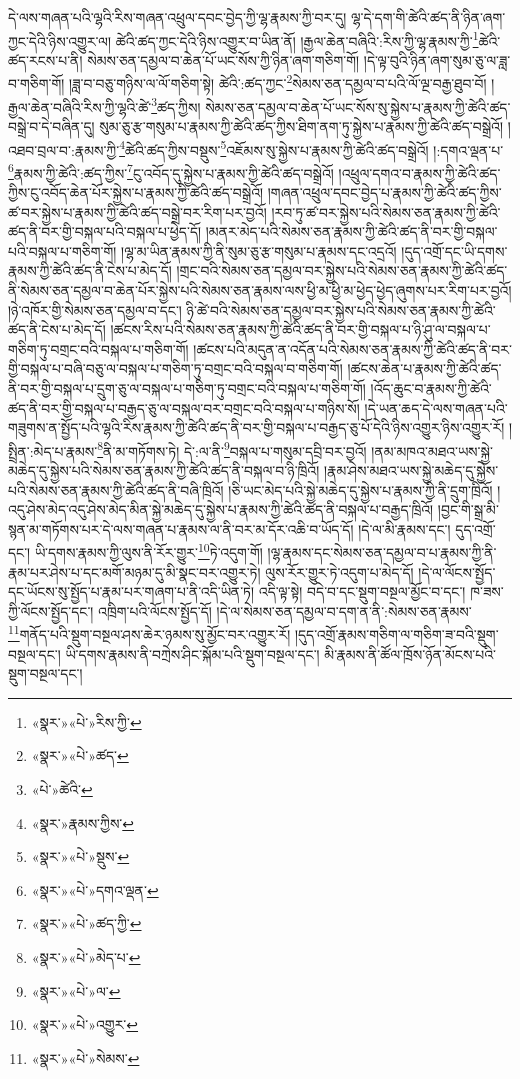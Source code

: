 དེ་ལས་གཞན་པའི་ལྷའི་རིས་གཞན་འཕྲུལ་དབང་བྱེད་ཀྱི་ལྷ་རྣམས་ཀྱི་བར་དུ། ལྷ་དེ་དག་གི་ཚེའི་ཚད་ནི་ཉིན་ཞག་ཀྱང་དེའི་ཉིས་འགྱུར་ལ། ཚེའི་ཚད་ཀྱང་དེའི་ཉིས་འགྱུར་བ་ཡིན་ནོ། །རྒྱལ་ཆེན་བཞིའི་:རིས་ཀྱི་ལྷ་རྣམས་ཀྱི་\footnote{«སྣར་»«པེ་»རིས་ཀྱི་}ཚེའི་ཚད་རངས་པ་ནི། སེམས་ཅན་དམྱལ་བ་ཆེན་པོ་ཡང་སོས་ཀྱི་ཉིན་ཞག་གཅིག་གོ། །དེ་ལྟ་བུའི་ཉིན་ཞག་སུམ་ཅུ་ལ་ཟླ་བ་གཅིག་གོ། །ཟླ་བ་བཅུ་གཉིས་ལ་ལོ་གཅིག་སྟེ། ཚེའི་:ཚད་ཀྱང་\footnote{«སྣར་»«པེ་»ཚད་}སེམས་ཅན་དམྱལ་བ་པའི་ལོ་ལྔ་བརྒྱ་ཐུབ་བོ། །རྒྱལ་ཆེན་བཞིའི་རིས་ཀྱི་ལྷའི་ཚེ་\footnote{«པེ་»ཚེའི་}ཚད་ཀྱིས། སེམས་ཅན་དམྱལ་བ་ཆེན་པོ་ཡང་སོས་སུ་སྐྱེས་པ་རྣམས་ཀྱི་ཚེའི་ཚད་བསྒྲེ་བ་དེ་བཞིན་དུ། སུམ་ཅུ་རྩ་གསུམ་པ་རྣམས་ཀྱི་ཚེའི་ཚད་ཀྱིས་ཐིག་ནག་ཏུ་སྐྱེས་པ་རྣམས་ཀྱི་ཚེའི་ཚད་བསྒྲེའོ། །འཐབ་བྲལ་བ་:རྣམས་ཀྱི་\footnote{«སྣར་»རྣམས་ཀྱིས་}ཚེའི་ཚད་ཀྱིས་བསྡུས་\footnote{«སྣར་»«པེ་»སྡུས་}འཇོམས་སུ་སྐྱེས་པ་རྣམས་ཀྱི་ཚེའི་ཚད་བསྒྲེའོ། །:དགའ་ལྡན་པ་\footnote{«སྣར་»«པེ་»དགའ་ལྡན་}རྣམས་ཀྱི་ཚེའི་:ཚད་ཀྱིས་\footnote{«སྣར་»«པེ་»ཚད་ཀྱི་}ངུ་འབོད་དུ་སྐྱེས་པ་རྣམས་ཀྱི་ཚེའི་ཚད་བསྒྲེའོ། །འཕྲུལ་དགའ་བ་རྣམས་ཀྱི་ཚེའི་ཚད་ཀྱིས་ངུ་འབོད་ཆེན་པོར་སྐྱེས་པ་རྣམས་ཀྱི་ཚེའི་ཚད་བསྒྲེའོ། །གཞན་འཕྲུལ་དབང་བྱེད་པ་རྣམས་ཀྱི་ཚེའི་ཚད་ཀྱིས་ཚ་བར་སྐྱེས་པ་རྣམས་ཀྱི་ཚེའི་ཚད་བསྒྲེ་བར་རིག་པར་བྱའོ། །རབ་ཏུ་ཚ་བར་སྐྱེས་པའི་སེམས་ཅན་རྣམས་ཀྱི་ཚེའི་ཚད་ནི་བར་གྱི་བསྐལ་པའི་བསྐལ་པ་ཕྱེད་དོ། །མནར་མེད་པའི་སེམས་ཅན་རྣམས་ཀྱི་ཚེའི་ཚད་ནི་བར་གྱི་བསྐལ་པའི་བསྐལ་པ་གཅིག་གོ། །ལྷ་མ་ཡིན་རྣམས་ཀྱི་ནི་སུམ་ཅུ་རྩ་གསུམ་པ་རྣམས་དང་འདྲའོ། །དུད་འགྲོ་དང་ཡི་དགས་རྣམས་ཀྱི་ཚེའི་ཚད་ནི་ངེས་པ་མེད་དོ། །གྲང་བའི་སེམས་ཅན་དམྱལ་བར་སྐྱེས་པའི་སེམས་ཅན་རྣམས་ཀྱི་ཚེའི་ཚད་ནི་སེམས་ཅན་དམྱལ་བ་ཆེན་པོར་སྐྱེས་པའི་སེམས་ཅན་རྣམས་ལས་ཕྱི་མ་ཕྱི་མ་ཕྱེད་ཕྱེད་ཞུགས་པར་རིག་པར་བྱའོ། །ཉེ་འཁོར་གྱི་སེམས་ཅན་དམྱལ་བ་དང་། ཉི་ཚེ་བའི་སེམས་ཅན་དམྱལ་བར་སྐྱེས་པའི་སེམས་ཅན་རྣམས་ཀྱི་ཚེའི་ཚད་ནི་ངེས་པ་མེད་དོ། །ཚངས་རིས་པའི་སེམས་ཅན་རྣམས་ཀྱི་ཚེའི་ཚད་ནི་བར་གྱི་བསྐལ་པ་ཉི་ཤུ་ལ་བསྐལ་པ་གཅིག་ཏུ་བགྲང་བའི་བསྐལ་པ་གཅིག་གོ། །ཚངས་པའི་མདུན་ན་འདོན་པའི་སེམས་ཅན་རྣམས་ཀྱི་ཚེའི་ཚད་ནི་བར་གྱི་བསྐལ་པ་བཞི་བཅུ་ལ་བསྐལ་པ་གཅིག་ཏུ་བགྲང་བའི་བསྐལ་བ་གཅིག་གོ། །ཚངས་ཆེན་པ་རྣམས་ཀྱི་ཚེའི་ཚད་ནི་བར་གྱི་བསྐལ་པ་དྲུག་ཅུ་ལ་བསྐལ་པ་གཅིག་ཏུ་བགྲང་བའི་བསྐལ་པ་གཅིག་གོ། །འོད་ཆུང་བ་རྣམས་ཀྱི་ཚེའི་ཚད་ནི་བར་གྱི་བསྐལ་པ་བརྒྱད་ཅུ་ལ་བསྐལ་བར་བགྲང་བའི་བསྐལ་པ་གཉིས་སོ། །དེ་ཡན་ཆད་དེ་ལས་གཞན་པའི་གཟུགས་ན་སྤྱོད་པའི་ལྷའི་རིས་རྣམས་ཀྱི་ཚེའི་ཚད་ནི་བར་གྱི་བསྐལ་པ་བརྒྱད་ཅུ་པོ་དེའི་ཉིས་འགྱུར་ཉིས་འགྱུར་རོ། །སྤྲིན་:མེད་པ་རྣམས་\footnote{«སྣར་»«པེ་»མེད་པ་}ནི་མ་གཏོགས་ཏེ། དེ་:ལ་ནི་\footnote{«སྣར་»«པེ་»ལ་}བསྐལ་པ་གསུམ་དབྲི་བར་བྱའོ། །ནམ་མཁའ་མཐའ་ཡས་སྐྱེ་མཆེད་དུ་སྐྱེས་པའི་སེམས་ཅན་རྣམས་ཀྱི་ཚེའི་ཚད་ནི་བསྐལ་བ་ཉི་ཁྲིའོ། །རྣམ་ཤེས་མཐའ་ཡས་སྐྱེ་མཆེད་དུ་སྐྱེས་པའི་སེམས་ཅན་རྣམས་ཀྱི་ཚེའི་ཚད་ནི་བཞི་ཁྲིའོ། །ཅི་ཡང་མེད་པའི་སྐྱེ་མཆེད་དུ་སྐྱེས་པ་རྣམས་ཀྱི་ནི་དྲུག་ཁྲིའོ། །འདུ་ཤེས་མེད་འདུ་ཤེས་མེད་མིན་སྐྱེ་མཆེད་དུ་སྐྱེས་པ་རྣམས་ཀྱི་ཚེའི་ཚད་ནི་བསྐལ་པ་བརྒྱད་ཁྲིའོ། །བྱང་གི་སྒྲ་མི་སྙན་མ་གཏོགས་པར་དེ་ལས་གཞན་པ་རྣམས་ལ་ནི་བར་མ་དོར་འཆི་བ་ཡོད་དོ། །དེ་ལ་མི་རྣམས་དང་། དུད་འགྲོ་དང་། ཡི་དགས་རྣམས་ཀྱི་ལུས་ནི་རོར་གྱུར་\footnote{«སྣར་»«པེ་»འགྱུར་}ཏེ་འདུག་གོ། །ལྷ་རྣམས་དང་སེམས་ཅན་དམྱལ་བ་པ་རྣམས་ཀྱི་ནི་རྣམ་པར་ཤེས་པ་དང་མགོ་མཉམ་དུ་མི་སྣང་བར་འགྱུར་ཏེ། ལུས་རོར་གྱུར་ཏེ་འདུག་པ་མེད་དོ། །དེ་ལ་ལོངས་སྤྱོད་དང་ཡོངས་སུ་སྤྱོད་པ་རྣམ་པར་གཞག་པ་ནི་འདི་ཡིན་ཏེ། འདི་ལྟ་སྟེ། བདེ་བ་དང་སྡུག་བསྔལ་མྱོང་བ་དང་། ཁ་ཟས་ཀྱི་ལོངས་སྤྱོད་དང་། འཁྲིག་པའི་ལོངས་སྤྱོད་དོ། །དེ་ལ་སེམས་ཅན་དམྱལ་བ་དག་ན་ནི་:སེམས་ཅན་རྣམས་\footnote{«སྣར་»«པེ་»སེམས་}གནོད་པའི་སྡུག་བསྔལ་ཤས་ཆེར་ཉམས་སུ་མྱོང་བར་འགྱུར་རོ། །དུད་འགྲོ་རྣམས་གཅིག་ལ་གཅིག་ཟ་བའི་སྡུག་བསྔལ་དང་། ཡི་དགས་རྣམས་ནི་བཀྲེས་ཤིང་སྐོམ་པའི་སྡུག་བསྔལ་དང་། མི་རྣམས་ནི་ཚོལ་ཁྲོས་ཉོན་མོངས་པའི་སྡུག་བསྔལ་དང་། 